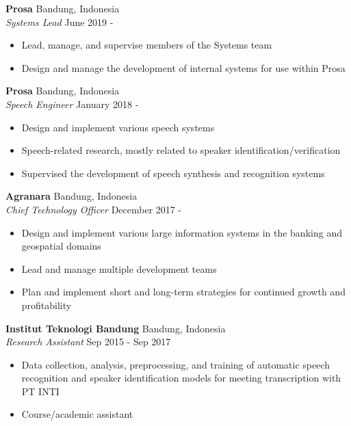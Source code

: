 \documentclass[a4paper]{article}
\begin{document}
\textbf{Prosa} \hfill Bandung, Indonesia\\
\textit{Systems Lead} \hfill June 2019 -\\
\vspace{-1mm}
\begin{itemize} \itemsep 1pt
  \item Lead, manage, and supervise members of the Systems team
  \item Design and manage the development of internal systems for use
    within Prosa
\end{itemize}
\textbf{Prosa} \hfill Bandung, Indonesia\\
\textit{Speech Engineer} \hfill January 2018 -\\
\vspace{-1mm}
\begin{itemize} \itemsep 1pt
  \item Design and implement various speech systems
  \item Speech-related research, mostly related to speaker
    identification/verification
  \item Supervised the development of speech synthesis and recognition systems
\end{itemize}
\textbf{Agranara} \hfill Bandung, Indonesia\\
\textit{Chief Technology Officer} \hfill December 2017 -\\
\vspace{-1mm}
\begin{itemize} \itemsep 1pt
	\item Design and implement various large information systems in the banking
    and geospatial domains
  \item Lead and manage multiple development teams
  \item Plan and implement short and long-term strategies for continued growth and
    profitability
\end{itemize}
\textbf{Institut Teknologi Bandung} \hfill Bandung, Indonesia\\
\textit{Research Assistant} \hfill Sep 2015 - Sep 2017\\
\vspace{-1mm}
\begin{itemize} \itemsep 1pt
	\item Data collection, analysis, preprocessing, and training of automatic
    speech recognition and speaker identification models for meeting
    transcription with PT INTI
  \item Course/academic assistant
\end{itemize}
\end{document}
